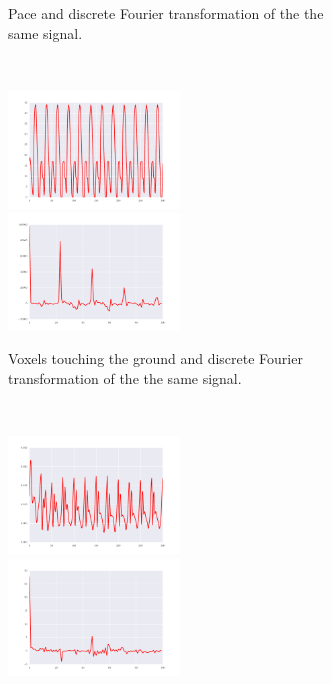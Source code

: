 \documentclass{sig-alternate}
\begin{document}
\begin{figure}[t!]
\begin{subfigure}[b]{0.23\textwidth}
\caption{Pace and discrete Fourier transformation of the the same signal.}
\end{subfigure}~
\begin{subfigure}[b]{0.23\textwidth}
\centering
\includegraphics[width=0.5\textwidth]{../Figures/Behaviors/vtg.pdf}~
\includegraphics[width=0.5\textwidth]{../Figures/Behaviors/vtgdft.pdf}
\caption{Voxels touching the ground and discrete Fourier transformation of the the same signal.}
\end{subfigure}\\
\begin{subfigure}[b]{0.23\textwidth}
\centering
\includegraphics[width=0.5\textwidth]{../Figures/Behaviors/pr.pdf}~
\includegraphics[width=0.5\textwidth]{../Figures/Behaviors/prdft.pdf}

\end{subfigure}
\end{figure}
\end{document}
